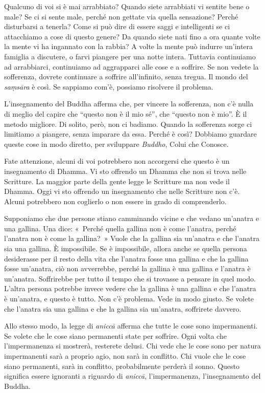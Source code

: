 Qualcuno di voi si è mai arrabbiato? Quando siete arrabbiati vi sentite
bene o male? Se ci si sente male, perché non gettate via quella
sensazione? Perché disturbarsi a tenerla? Come si può dire di essere
saggi e intelligenti se ci attacchiamo a cose di questo genere? Da
quando siete nati fino a ora quante volte la mente vi ha ingannato con
la rabbia? A volte la mente può indurre un'intera famiglia a discutere,
o farvi piangere per una notte intera. Tuttavia continuiamo ad
arrabbiarci, continuiamo ad aggrapparci alle cose e a soffrire. Se non
vedete la sofferenza, dovrete continuare a soffrire all'infinito, senza
tregua. Il mondo del \emph{saṃsāra} è così. Se sappiamo com'è, possiamo
risolvere il problema.

L'insegnamento del Buddha afferma che, per vincere la sofferenza, non
c'è nulla di meglio del capire che ``questo non è il mio sé'', che
``questo non è mio''. È il metodo migliore. Di solito, però, non ci
badiamo. Quando la sofferenza sorge ci limitiamo a piangere, senza
imparare da essa. Perché è così? Dobbiamo guardare queste cose in modo
diretto, per sviluppare \emph{Buddho}, Colui che Conosce.

Fate attenzione, alcuni di voi potrebbero non accorgersi che questo è un
insegnamento di Dhamma. Vi sto offrendo un Dhamma che non si trova nelle
Scritture. La maggior parte della gente legge le Scritture ma non vede
il Dhamma. Oggi vi sto offrendo un insegnamento che nelle Scritture non
c'è. Alcuni potrebbero non coglierlo o non essere in grado di
comprenderlo.

Supponiamo che due persone stiano camminando vicine e che vedano
un'anatra e una gallina. Una dice: «~Perché quella gallina non è come
l'anatra, perché l'anatra non è come la gallina?~» Vuole che la gallina
sia un'anatra e che l'anatra sia una gallina. È impossibile. Se è
impossibile, allora anche se quella persona desiderasse per il resto
della vita che l'anatra fosse una gallina e che la gallina fosse
un'anatra, ciò non avverrebbe, perché la gallina è una gallina e
l'anatra è un'anatra. Soffrirebbe per tutto il tempo che si trovasse a
pensare in quel modo. L'altra persona potrebbe invece vedere che la
gallina è una gallina e che l'anatra è un'anatra, e questo è tutto. Non
c'è problema. Vede in modo giusto. Se volete che l'anatra sia una
gallina e che la gallina sia un'anatra, soffrirete davvero.

Allo stesso modo, la legge di \emph{aniccā} afferma che tutte le cose
sono impermanenti. Se volete che le cose siano permanenti state per
soffrire. Ogni volta che l'impermanenza si mostrerà, resterete delusi.
Chi vede che le cose sono per natura impermanenti sarà a proprio agio,
non sarà in conflitto. Chi vuole che le cose siano permanenti, sarà in
conflitto, probabilmente perderà il sonno. Questo significa essere
ignoranti a riguardo di \emph{aniccā}, l'impermanenza, l'insegnamento
del Buddha.

